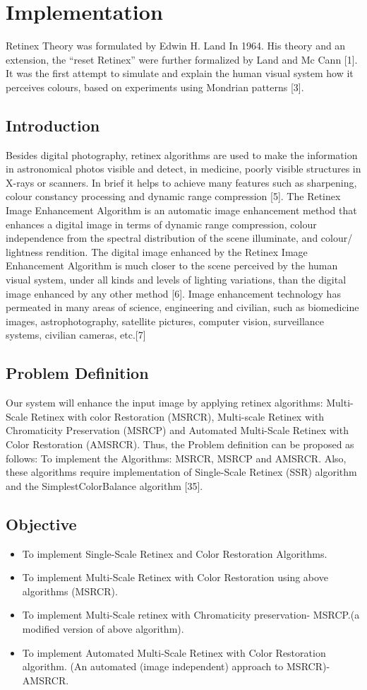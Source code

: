 \chapter{Implementation}
Retinex Theory was formulated by Edwin H. Land In 1964. His theory and an extension, the “reset Retinex” were further formalized by Land and Mc Cann [1]. It was the first attempt to simulate and explain the human visual system how it perceives colours, based on experiments using Mondrian patterns [3].
\section{Introduction}
Besides digital photography, retinex algorithms are used to make the information in astronomical photos visible and detect, in medicine, poorly visible structures in X-rays or scanners. In brief it helps to achieve many features such as sharpening, colour constancy processing and dynamic range compression [5]. The Retinex Image Enhancement Algorithm is an automatic image enhancement method that enhances a digital image in terms of dynamic range compression, colour independence from the spectral distribution of the scene illuminate, and colour/ lightness rendition. The digital image enhanced by the Retinex Image Enhancement Algorithm is much closer to the scene perceived by the human visual system, under all kinds and levels of lighting variations, than the digital image enhanced by any other method [6]. Image enhancement technology has permeated in many areas of science, engineering and civilian, such as biomedicine images, astrophotography, satellite pictures, computer vision, surveillance systems, civilian cameras, etc.[7]

\section{Problem Definition}
Our system will enhance the input image by applying retinex algorithms: Multi-Scale Retinex with color Restoration (MSRCR), Multi-scale Retinex with Chromaticity Preservation (MSRCP) and Automated Multi-Scale Retinex with Color Restoration (AMSRCR). Thus, the Problem definition can be proposed as follows: To implement the Algorithms: MSRCR, MSRCP and AMSRCR. Also, these algorithms require implementation of Single-Scale Retinex (SSR) algorithm and the SimplestColorBalance algorithm [35].
\section{Objective}
	\begin{itemize}
		\item To implement Single-Scale Retinex and Color Restoration Algorithms.
		\item To implement Multi-Scale Retinex with Color Restoration using above 
		algorithms (MSRCR).
		\item To implement Multi-Scale retinex with Chromaticity preservation- MSRCP.(a 
		modified version of above algorithm).
		\item To implement Automated Multi-Scale Retinex with Color Restoration algorithm.	
		(An automated (image independent) approach to MSRCR)- AMSRCR.
	\end{itemize}
	

